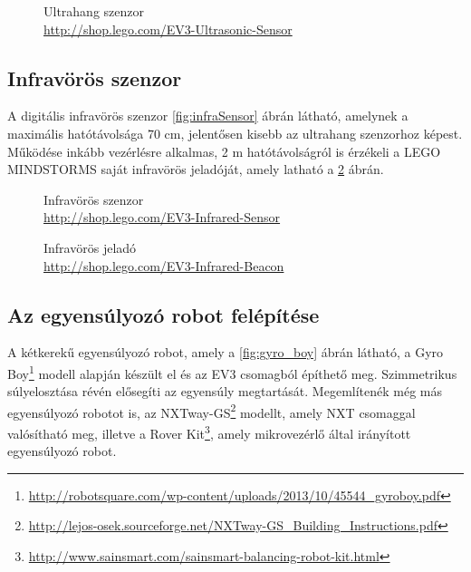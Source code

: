 \begin{figure}[!htb]
	\centering
	\caption[Ultrahang szenzor]
	{Ultrahang szenzor\\
	\href{http://shop.lego.com/en-CA/EV3-Ultrasonic-Sensor-45504}{http://shop.lego.com/EV3-Ultrasonic-Sensor}}
	\label{fig:ultrasonicSensor}
\end{figure}

\subsection{Infravörös szenzor}
A digitális infravörös szenzor \ref{fig:infraSensor} ábrán látható, amelynek a maximális hatótávolsága 70 cm, jelentősen kisebb az ultrahang szenzorhoz képest. Működése inkább vezérlésre alkalmas, 2 m hatótávolságról is érzékeli a LEGO MINDSTORMS saját infravörös jeladóját, amely latható a \ref{fig:beacon} ábrán.

\begin{figure}[!htb]
	\centering
	\captionsetup{justification=centering}
	\caption[Infravörös szenzor]
	{Infravörös szenzor\\
	\href{http://shop.lego.com/en-CA/EV3-Infrared-Sensor-45509}{http://shop.lego.com/EV3-Infrared-Sensor}}
	\label{fig:infraSensor}
	\endminipage
	\captionsetup{justification=centering}
	\caption[Infravörös jeladó]
	{Infravörös jeladó\\
	\href{http://shop.lego.com/en-CA/EV3-Infrared-Beacon-45508}{http://shop.lego.com/EV3-Infrared-Beacon}}
	\label{fig:beacon}
	\endminipage
\end{figure}

\subsection{Az egyensúlyozó robot felépítése}{\label{egyensulySubSec}}

A kétkerekű egyensúlyozó robot, amely a \ref{fig:gyro_boy} ábrán látható, a Gyro Boy\footnote{\href{http://robotsquare.com/wp-content/uploads/2013/10/45544\_gyroboy.pdf}{http://robotsquare.com/wp-content/uploads/2013/10/45544\_gyroboy.pdf}} modell alapján készült el és az EV3 csomagból építhető meg. Szimmetrikus súlyelosztása révén elősegíti az egyensúly megtartását. Megemlítenék még más egyensúlyozó robotot is, az NXTway-GS\footnote{\href{http://lejos-osek.sourceforge.net/NXTway-GS\_Building\_Instructions.pdf}{http://lejos-osek.sourceforge.net/NXTway-GS\_Building\_Instructions.pdf}} modellt, amely NXT csomaggal valósítható meg, illetve a Rover Kit\footnote{\href{http://www.sainsmart.com/sainsmart-balancing-robot-kit.html}{http://www.sainsmart.com/sainsmart-balancing-robot-kit.html}}, amely mikrovezérlő által irányított egyensúlyozó robot.

